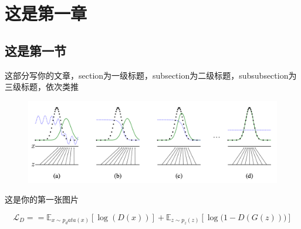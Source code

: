 \documentclass[a4paper, twoside]{ltxdoc}
\numberwithin{equation}{section} %
\begin{document}
{
\setcounter{page}{1}
\pretocmd{\section}{\clearpage \vspace*{-2.0em}}{}{}

\setlength{\parindent}{2em} %
\setlength{\parskip}{0em} %
\setlength{\lineskip}{0em} %
\setlength{\baselineskip}{20pt} %

\section{这是第一章}
\subsection{这是第一节}
这部分写你的文章，section为一级标题，subsection为二级标题，subsubsection为三级标题，依次类推

\begin{figure}[!htb]
	\centering
	\includegraphics[scale=0.5]{images/test.png} %
\end{figure}

这是你的第一张图片~\cite{avriel2003nonlinear}

\begin{equation} \label{equ:1.1}
\mathcal{L}_D= = \mathbb{E}_{x \sim p_data(x)} [\log{(D(x))}]+ \mathbb{E}_{z \sim p_z (z)} [\log⁡{(1-D(G(z))})]  
\end{equation}

}
\end{document}
